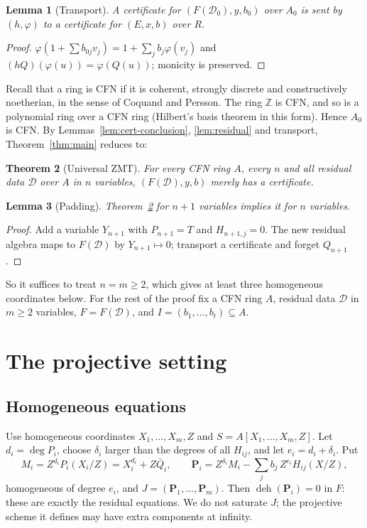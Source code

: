 \documentclass[11pt]{amsart}
\numberwithin{equation}{section}
\newtheorem{theorem}{Theorem}[section]
\newtheorem{lemma}[theorem]{Lemma}
\theoremstyle{definition}
\theoremstyle{remark}
\DeclareMathOperator{\deh}{deh}
\newcommand{\ZZ}{\mathbb Z}
\begin{document}
\begin{lemma}[Transport]
A certificate for $(F(\mathcal D_0),y,b_0)$ over $A_0$ is sent by
$(h,\varphi)$ to a certificate for $(E,x,b)$ over $R$.
\end{lemma}
\begin{proof}
$\varphi(1+\sum b_{0j}v_j)=1+\sum_jb_j\varphi(v_j)$ and
$(hQ)(\varphi(u))=\varphi(Q(u))$; monicity is preserved.
\end{proof}

Recall that a ring is CFN if it is coherent, strongly discrete and
constructively noetherian, in the sense of Coquand and Persson. The
ring $\ZZ$ is CFN, and so is a polynomial ring over a CFN ring
(Hilbert's basis theorem in this form). Hence $A_0$ is CFN. By
Lemmas~\ref{lem:cert-conclusion}, \ref{lem:residual} and transport,
Theorem~\ref{thm:main} reduces to:

\begin{theorem}[Universal ZMT]\label{thm:universal}
For every CFN ring $A$, every $n$ and all residual data $\mathcal D$
over $A$ in $n$ variables, $(F(\mathcal D),y,b)$ merely has a
certificate.
\end{theorem}

\begin{lemma}[Padding]\label{lem:padding}
Theorem~\ref{thm:universal} for $n+1$ variables implies it for $n$
variables.
\end{lemma}
\begin{proof}
Add a variable $Y_{n+1}$ with $P_{n+1}=T$ and $H_{n+1,j}=0$. The new
residual algebra maps to $F(\mathcal D)$ by $Y_{n+1}\mapsto0$; transport a
certificate and forget $Q_{n+1}$.
\end{proof}

So it suffices to treat $n=m\ge2$, which gives at least three
homogeneous coordinates below. For the rest of the proof fix a CFN ring
$A$, residual data $\mathcal D$ in $m\ge2$ variables, $F=F(\mathcal D)$,
and $I=(b_1,\ldots,b_t)\subseteq A$.

\section{The projective setting}\label{sec:projective}

\subsection{Homogeneous equations}
Use homogeneous coordinates $X_1,\ldots,X_m,Z$ and
$S=A[X_1,\ldots,X_m,Z]$. Let $d_i=\deg P_i$, choose $\delta_i$ larger
than the degrees of all $H_{ij}$, and let $e_i=d_i+\delta_i$. Put
\[
 M_i=Z^{d_i}P_i(X_i/Z)=X_i^{d_i}+Z\bar Q_i,\qquad
 \mathbf P_i=Z^{\delta_i}M_i-\sum_jb_j\,Z^{e_i}H_{ij}(X/Z),
\]
homogeneous of degree $e_i$, and $J=(\mathbf P_1,\ldots,\mathbf P_m)$.
Then $\deh(\mathbf P_i)=0$ in $F$: these are exactly the residual
equations. We do not saturate $J$; the projective scheme it defines may
have extra components at infinity.
\end{document}
